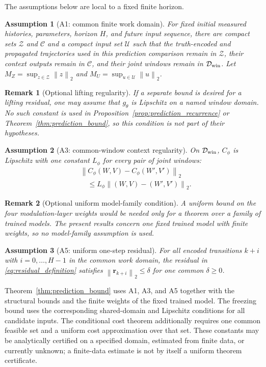 \documentclass[journal]{IEEEtran}
\newtheorem{assumption}{Assumption}
\newtheorem{remark}{Remark}
\newcommand{\vr}{\mathbf{r}}
\newcommand{\norm}[1]{\left\lVert #1\right\rVert}
\begin{document}
The assumptions below are local to a fixed finite horizon.
\begin{assumption}[A1: common finite work domain]
\label{ass:a1}
For fixed initial measured histories, parameters, horizon $H$, and future input sequence, there are compact sets $\mathcal Z$ and $\mathcal C$ and a compact input set $\mathcal U$ such that the truth-encoded and propagated trajectories used in this prediction comparison remain in $\mathcal Z$, their context outputs remain in $\mathcal C$, and their joint windows remain in $\mathcal D_{\rm win}$. Let $M_Z=\sup_{z\in\mathcal Z}\norm{z}_2$ and $M_U=\sup_{u\in\mathcal U}\norm{u}_2$.
\end{assumption}
\begin{remark}[Optional lifting regularity]
If a separate bound is desired for a lifting residual, one may assume that $g_\theta$ is Lipschitz on a named window domain. No such constant is used in Proposition~\ref{prop:prediction_recurrence} or Theorem~\ref{thm:prediction_bound}, so this condition is not part of their hypotheses.
\end{remark}
\begin{assumption}[A3: common-window context regularity]
\label{ass:a3}
On $\mathcal D_{\rm win}$, $C_\phi$ is Lipschitz with one constant $L_\phi$ for every pair of joint windows:
\begin{equation}
\begin{aligned}
&\norm{C_\phi(W,V)-C_\phi(W',V')}_2\\
&\quad\le L_\phi\norm{(W,V)-(W',V')}_2.
\end{aligned}
\end{equation}
\end{assumption}
\begin{remark}[Optional uniform model-family condition]
A uniform bound on the four modulation-layer weights would be needed only for a theorem over a family of trained models. The present results concern one fixed trained model with finite weights, so no model-family assumption is used.
\end{remark}
\begin{assumption}[A5: uniform one-step residual]
\label{ass:a5}
For all encoded transitions $k+i$ with $i=0,\ldots,H-1$ in the common work domain, the residual in \eqref{eq:residual_definition} satisfies $\norm{\vr_{k+i}}_2\le\delta$ for one common $\delta\ge0$.
\end{assumption}
Theorem~\ref{thm:prediction_bound} uses A1, A3, and A5 together with the structural bounds and the finite weights of the fixed trained model. The freezing bound uses the corresponding shared-domain and Lipschitz conditions for all candidate inputs. The conditional cost theorem additionally requires one common feasible set and a uniform cost approximation over that set. These constants may be analytically certified on a specified domain, estimated from finite data, or currently unknown; a finite-data estimate is not by itself a uniform theorem certificate.
\end{document}
